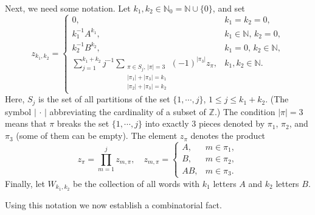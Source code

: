 \documentclass[reqno,10pt,centertags]{amsart}
\newcommand{\bbN}{{\mathbb{N}}}
\newcommand{\bbZ}{{\mathbb{Z}}}
\newcommand{\dott}{\,\cdot\,}
\newcommand{\lb}{\label}
\let\leq\leqslant
\numberwithin{equation}{section}
\theoremstyle{remark}
\begin{document}
Next, we need some notation. 
Let $k_1,k_2 \in \bbN_0 = \bbN \cup \{0\}$, and set
\begin{equation} 
z_{k_1,k_2}= \begin{cases}
0, & k_1=k_2=0, \\
k_1^{-1} A^{k_1}, & k_1\in \bbN, \, k_2 = 0, \\
k_2^{-1} B^{k_2}, & k_1 = 0, \, k_2 \in \bbN, \\
\sum_{j=1}^{k_1+k_2} j^{-1} 
\sum_{\substack{\pi\in S_j, \, |\pi|=3\\|\pi_1|+|\pi_3|=k_1\\|\pi_2|+|\pi_3|=k_2}}(-1)^{|\pi_3|}z_{\pi}, & k_1,k_2 \in \bbN. 
\end{cases}     \lb{D.z} 
\end{equation} 
Here, $S_j$ is the set of all partitions of the set $\{1,\cdots,j\}$, $1 \leq j \leq k_1 + k_2$. 
(The symbol $|\dott|$ abbreviating the cardinality of a subset of $\bbZ$.) 
The condition $|\pi|=3$ means that $\pi$ breaks the set $\{1,\cdots,j\}$ into exactly $3$ pieces denoted by $\pi_1$, $\pi_2$, and $\pi_3$ (some of them can be empty). The element $z_{\pi}$ denotes the product
\begin{equation}
z_{\pi}=\prod_{m=1}^jz_{m,\pi},\quad z_{m,\pi}=
\begin{cases}
A,& m\in\pi_1,\\
B,& m\in\pi_2,\\
AB,& m\in\pi_3.
\end{cases}
\end{equation} 
Finally, let $W_{k_1,k_2}$ be the collection of all words with $k_1$ letters $A$ and $k_2$ letters $B$. 

Using this notation we now establish a combinatorial fact. 
\end{document}
